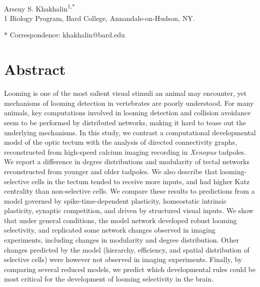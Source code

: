 \documentclass{article}
\begin{document}


\linenumbers %

\begin{flushleft}
{\Large
\textbf{}
}
\newline
\\
Arseny S. Khakhalin\textsuperscript{1,*}
\\
\bigskip
{1} Biology Program, Bard College, Annandale-on-Hudson, NY. 

* Correspondence: khakhalin@bard.edu

\section*{Abstract}
Looming is one of the most salient visual stimuli an animal may encounter, yet mechanisms of looming detection in vertebrates are poorly understood. For many animals, key computations involved in looming detection and collision avoidance seem to be performed by distributed networks, making it hard to tease out the underlying mechanisms. In this study, we contrast a computational developmental model of the optic tectum with the analysis of directed connectivity graphs, reconstructed from high-speed calcium imaging recording in \textit{Xenopus} tadpoles. We report a difference in degree distributions and modularity of tectal networks reconstructed from younger and older tadpoles. We also describe that looming-selective cells in the tectum tended to receive more inputs, and had higher Katz centrality than non-selective cells. We compare these results to predictions from a model governed by spike-time-dependent plasticity, homeostatic intrinsic plasticity, synaptic competition, and driven by structured visual inputs. We show that under general conditions, the model network developed robust looming selectivity, and replicated some network changes observed in imaging experiments, including changes in modularity and degree distribution. Other changes predicted by the model (hierarchy, efficiency, and spatial distribution of selective cells) were however not observed in imaging experiments. Finally, by comparing several reduced models, we predict which developmental rules could be most critical for the development of looming selectivity in the brain.
\bigskip

\end{flushleft} %
\end{document}
